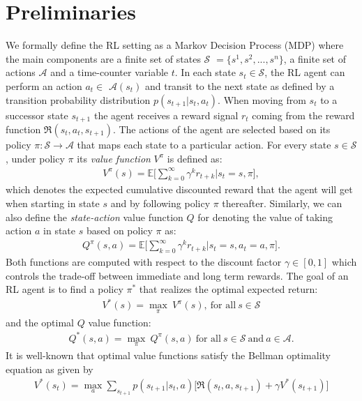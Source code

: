 \section{Preliminaries}
We formally define the RL setting as a Markov Decision Process (MDP) where the main components are a finite set of states $\mathcal{S}$ $=\{s^{1}, s^{2},...,s^{n}\}$, a finite set of actions $\mathcal{A}$ and a time-counter variable $t$. In each state $s_{t}\in \mathcal{S}$, the RL agent can perform an action $a_{t} \in$ $\mathcal{A}(s_t)$ and transit to the next state as defined by a transition probability distribution $p(s_{t+1} | s_{t}, a_{t})$.
 When moving from $s_t$ to a successor state $s_{t+1}$ the agent receives a reward signal $r_t$ coming from the reward function $\Re (s_{t}, a_{t}, s_{t+1})$. The actions of the agent are selected based on its policy $\pi:\mathcal{S} \rightarrow \mathcal{A}$ that maps each state to a particular action. For every state $s \in \mathcal{S}$, under policy $\pi$ its \textit{value function} $V^{\pi}$ is defined as:
\begin{align}
    V^{\pi}(s)=\mathds{E}\bigg[\sum_{k=0}^{\infty}\gamma^{k}r_{t+k}\bigg| s_t = s, \pi \bigg],
\end{align}
which denotes the expected cumulative discounted reward that the agent will get when starting in state $s$ and by following policy $\pi$ thereafter. Similarly, we can also define the \textit{state-action} value function $Q$ for denoting the value of taking action $a$ in state $s$ based on policy $\pi$ as:
\begin{align}
    Q^{\pi}(s,a)=\mathds{E}\bigg[\sum_{k=0}^{\infty}\gamma^{k}r_{t+k} \bigg| s_t = s, a_t=a, \pi\bigg].
\end{align}
Both functions are computed with respect to the discount factor $\gamma \in [0,1]$ which controls the trade-off between immediate and long term rewards. The goal of an RL agent is to find a policy $\pi^{*}$ that realizes the optimal expected return:
\begin{align}
 V^{*}(s)=\underset{\pi}{\max}\:V^{\pi}(s), \ \text{for all} \ s\in\mathcal{S}
\end{align}
and the optimal $Q$ value function:
\begin{align}
Q^{*}(s,a)= \underset{\pi}{\max}\:Q^{\pi}(s,a) \ \text{for all} \ s\in\mathcal{S} \ \text{and} \ a \in\mathcal{A}.
\end{align}
It is well-known that optimal value functions satisfy the Bellman optimality equation as given by
\begin{align}
    V^{*}(s_t) = \underset{a}{\max}\sum_{s_{t+1}}p(s_{t+1} | s_{t}, a) \bigg[\Re (s_{t}, a, s_{t+1}) + \gamma V^{*}(s_{t+1}) \bigg]
\end{align}
